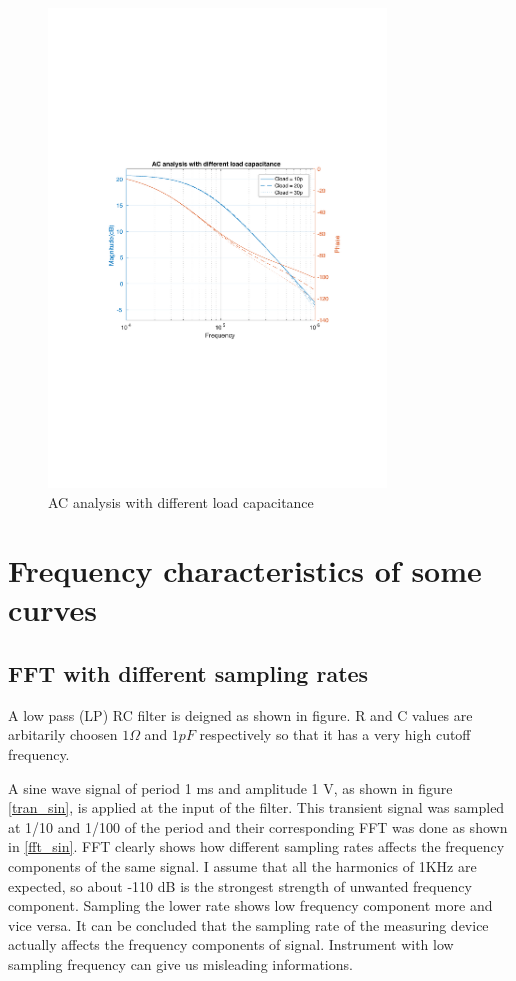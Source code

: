 \documentclass[12pt,a4paper,UKenglish]{article}
\begin{document}
\begin{figure} [H]
  \centering 
  \includegraphics[width=0.8\textwidth]{img/1d.pdf} 
  \caption{AC analysis with different load capacitance}
  \label{ac_cload} 
\end{figure}

\section{Frequency characteristics of some curves}
\subsection{FFT with different sampling rates}

A low pass (LP) RC filter is deigned as shown in figure. R and C values are arbitarily choosen $1 \Omega$ and $1pF$ respectively so that it has a very high cutoff frequency. 

A sine wave signal of period 1 ms and amplitude 1 V, as shown in figure \ref{tran_sin}, is applied at the input of the filter. This transient signal was sampled at 1/10 and 1/100 of the period and their corresponding FFT was done as shown in \ref{fft_sin}. FFT clearly shows how different sampling rates affects the frequency components of the same signal. I assume that all the harmonics of 1KHz are expected, so about -110 dB is the strongest strength of unwanted frequency component. Sampling the lower rate shows low frequency component more and vice versa. It can be concluded that the sampling rate of the measuring device actually affects the frequency components of signal. Instrument with low sampling frequency can give us misleading informations.
\end{document}
